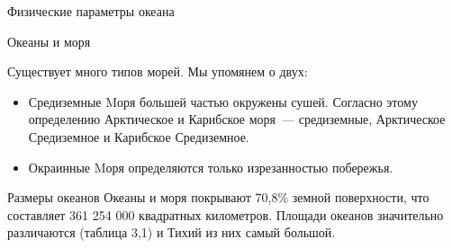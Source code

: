 \begin{chapter}{Физические параметры океана}
\begin{section}{Океаны и моря}
\begin{description}
\end{description}

Существует много типов морей. Мы упомянем о двух:
\begin{itemize}
\item 
Средиземные Mоря большей частью окружены сушей. Согласно этому
определению Арктическое и Карибское моря~--- средиземные, Арктическое
Средиземное и Карибское Средиземное.
%

\item
Окраинные Mоря определяются только изрезанностью побережья.
%
\end{itemize}
\end{section}


\begin{section}{Размеры океанов}
Океаны и моря покрывают 70,8\% земной поверхности, что составляет 361
254 000 квадратных километров. Площади океанов значительно различаются
(таблица 3,1) и Тихий из них самый большой.
%


\end{section}
\end{chapter}
